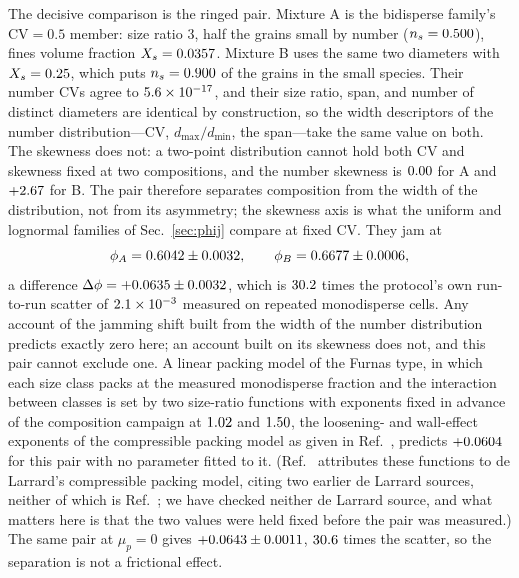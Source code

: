 \documentclass[reprint,aps,pre,amsmath,amssymb,superscriptaddress,longbibliography,nofootinbib,floatfix]{revtex4-2}
\newcommand{\mup}{\mu_{p}}
\newcommand{\CV}{\mathrm{CV}}
\newcommand{\Xs}{X_{s}}
\begin{document}
The decisive comparison is the ringed pair.
Mixture A is the bidisperse family's $\CV=0.5$ member: size ratio $3$, half the grains small by number ($n_s=0.500$), fines volume fraction $\Xs=\pairXsA$.
Mixture B uses the same two diameters with $\Xs=\pairXsB$, which puts $n_s=0.900$ of the grains in the small species.
Their number $\CV$s agree to $5.6\times10^{-17}$, and their size ratio, span, and number of distinct diameters are identical by construction, so the width descriptors of the number distribution---$\CV$, $d_{\max}/d_{\min}$, the span---take the same value on both.
The skewness does not: a two-point distribution cannot hold both $\CV$ and skewness fixed at two compositions, and the number skewness is $0.00$ for A and $+2.67$ for B.
The pair therefore separates composition from the width of the distribution, not from its asymmetry; the skewness axis is what the uniform and lognormal families of Sec.~\ref{sec:phij} compare at fixed $\CV$.
They jam at
\begin{equation}
\phi_A=0.6042\pm0.0032,\qquad \phi_B=0.6677\pm0.0006,
\end{equation}
a difference $\Delta\phi=+0.0635\pm0.0032$, which is $30.2$ times the protocol's own run-to-run scatter of $2.1\times10^{-3}$ measured on repeated monodisperse cells.
Any account of the jamming shift built from the width of the number distribution predicts exactly zero here; an account built on its skewness does not, and this pair cannot exclude one.
A linear packing model of the Furnas type, in which each size class packs at the measured monodisperse fraction and the interaction between classes is set by two size-ratio functions with exponents fixed in advance of the composition campaign at $1.02$ and $1.50$, the loosening- and wall-effect exponents of the compressible packing model as given in Ref.~\cite{diaz2021packing}, predicts $+0.0604$ for this pair with no parameter fitted to it.
(Ref.~\cite{diaz2021packing} attributes these functions to de Larrard's compressible packing model, citing two earlier de Larrard sources, neither of which is Ref.~\cite{delarrard1999concrete}; we have checked neither de Larrard source, and what matters here is that the two values were held fixed before the pair was measured.)
The same pair at $\mup=0$ gives $+0.0643\pm0.0011$, $30.6$ times the scatter, so the separation is not a frictional effect.
\end{document}
